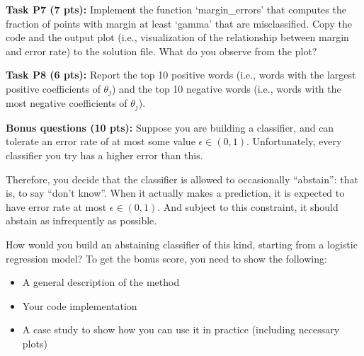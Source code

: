 \documentclass[12pt]{article}
\begin{document}
\textbf{Task P7 (7 pts):} Implement the function `margin\_errors' that computes the fraction of points with margin at least `gamma' that are misclassified. Copy the code and the output plot (i.e., visualization of the relationship between margin and error rate) to the solution file. What do you observe from the plot?

\textbf{Task P8 (6 pts):} Report the top 10 positive words (i.e., words with the largest positive coefficients of $\theta_j$) and the top 10 negative words (i.e., words with the most negative coefficients of $\theta_j$). 

\textbf{Bonus questions (10 pts):} Suppose you are building a classifier, and can tolerate an error rate of at most some value $\epsilon\in(0,1)$. Unfortunately, every classifier you try has a higher error than this. 

Therefore, you decide that the classifier is allowed to occasionally ``abstain'': that is, to say ``don't know''. When it actually makes a prediction, it is expected to have error rate at most $\epsilon\in(0,1)$. And subject to this constraint, it should abstain as infrequently as possible.

How would you build an abstaining classifier of this kind, starting from a logistic regression model? To get the bonus score, you need to show the following:

\begin{itemize}
    \item A general description of the method
    \item Your code implementation
    \item A case study to show how you can use it in practice (including necessary plots)
\end{itemize}
\end{document}
